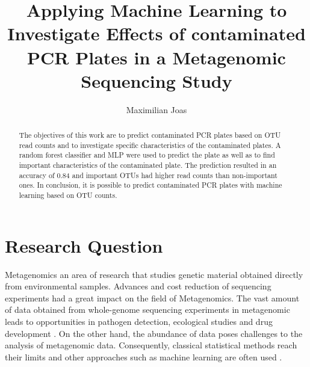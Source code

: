 \documentclass{svproc}
\begin{document}
\mainmatter              %
%
\title{Applying Machine Learning to Investigate Effects of contaminated PCR Plates in a Metagenomic Sequencing Study}
%
%
\author{Maximilian Joas }
%
%
%
%
\maketitle              %
%
\begin{abstract}
  The objectives of this work are to predict contaminated PCR plates based on OTU read counts and to investigate specific characteristics of the contaminated plates. A random forest classifier and MLP were used to predict the plate as well as to find important characteristics of the contaminated plate. The prediction resulted in an accuracy of 0.84 and important OTUs had higher read counts than non-important ones. In conclusion, it is possible to predict contaminated PCR plates with machine learning based on OTU counts.
\end{abstract}
%
%
\section{Research Question}
%
Metagenomics an area of research that studies genetic material obtained directly from environmental samples.
Advances and cost reduction of sequencing experiments had a great impact on the field of Metagenomics.
The vast amount of data obtained from whole-genome sequencing experiments in metagenomic leads to opportunities in pathogen detection, ecological studies and drug development \cite{THREE OPNE TABS}. On the other hand, the abundance of data poses challenges to the analysis of metagenomic data. Consequently, classical statistical methods reach their limits and other approaches such as machine learning are often used \cite{Soueidan2017}.\\
\end{document}
